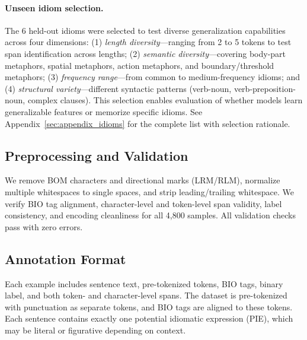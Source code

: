 \documentclass[11pt]{article}
\begin{document}
\paragraph{Unseen idiom selection.}
The 6 held-out idioms were selected to test diverse generalization capabilities across four dimensions: (1) \textit{length diversity}---ranging from 2 to 5 tokens to test span identification across lengths; (2) \textit{semantic diversity}---covering body-part metaphors, spatial metaphors, action metaphors, and boundary/threshold metaphors; (3) \textit{frequency range}---from common to medium-frequency idioms; and (4) \textit{structural variety}---different syntactic patterns (verb-noun, verb-preposition-noun, complex clauses). This selection enables evaluation of whether models learn generalizable features or memorize specific idioms. See Appendix~\ref{sec:appendix_idioms} for the complete list with selection rationale.

\subsection{Preprocessing and Validation}

We remove BOM characters and directional marks (LRM/RLM), normalize multiple whitespaces to single spaces, and strip leading/trailing whitespace. We verify BIO tag alignment, character-level and token-level span validity, label consistency, and encoding cleanliness for all 4,800 samples. All validation checks pass with zero errors.

\subsection{Annotation Format}

Each example includes sentence text, pre-tokenized tokens, BIO tags, binary label, and both token- and character-level spans. The dataset is pre-tokenized with punctuation as separate tokens, and BIO tags are aligned to these tokens. Each sentence contains exactly one potential idiomatic expression (PIE), which may be literal or figurative depending on context.
\end{document}
